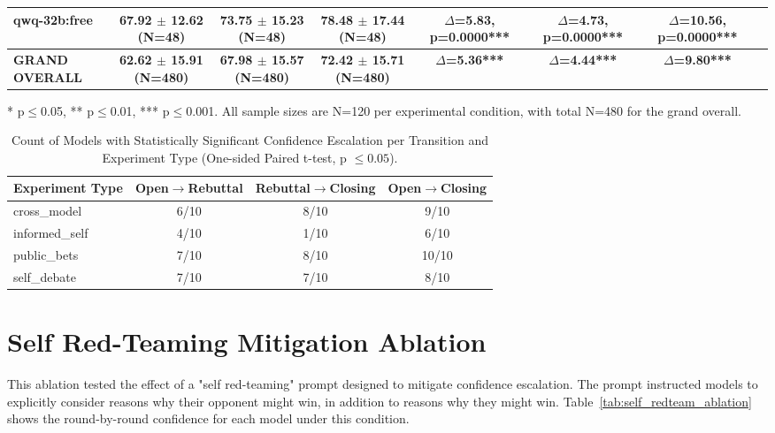 \documentclass{article}
\begin{document}
\begin{table}[htbp]
{\begin{tabular}{lccccccc}
    qwq-32b:free & 67.92 $\pm$ 12.62 (N=48) & 73.75 $\pm$ 15.23 (N=48) & 78.48 $\pm$ 17.44 (N=48) & $\Delta$=5.83, p=0.0000*** & $\Delta$=4.73, p=0.0000*** & $\Delta$=10.56, p=0.0000*** \\
    \midrule
    \textbf{GRAND OVERALL} & \textbf{62.62 $\pm$ 15.91 (N=480)} & \textbf{67.98 $\pm$ 15.57 (N=480)} & \textbf{72.42 $\pm$ 15.71 (N=480)} & \textbf{$\Delta$=5.36***} & \textbf{$\Delta$=4.44***} & \textbf{$\Delta$=9.80***} \\
    \bottomrule
  \end{tabular}
  }
  \vspace{0.2cm}
  \footnotesize{* p$\leq$0.05, ** p$\leq$0.01, *** p$\leq$0.001. All sample sizes are N=120 per experimental condition, with total N=480 for the grand overall.}
\end{table}


\begin{table}[htbp]
  \centering
  \caption{Count of Models with Statistically Significant Confidence Escalation per Transition and Experiment Type (One-sided Paired t-test, p $\leq 0.05$).}
  \label{tab:sig_escalation_summary}
  \begin{tabular}{lccc}
    \toprule
    \textbf{Experiment Type} & \textbf{Open$\rightarrow$Rebuttal} & \textbf{Rebuttal$\rightarrow$Closing} & \textbf{Open$\rightarrow$Closing} \\
    \midrule
    cross\_model    & 6/10 & 8/10 & 9/10 \\
    informed\_self  & 4/10 & 1/10 & 6/10 \\
    public\_bets    & 7/10 & 8/10 & 10/10 \\
    self\_debate    & 7/10 & 7/10 & 8/10 \\
    \bottomrule
  \end{tabular}
\end{table}

\section{Self Red-Teaming Mitigation Ablation}
\label{appendix:self_redteam_ablation}
This ablation tested the effect of a "self red-teaming" prompt designed to mitigate confidence escalation. The prompt instructed models to explicitly consider reasons why their opponent might win, in addition to reasons why they might win. Table~\ref{tab:self_redteam_ablation} shows the round-by-round confidence for each model under this condition.
\end{document}

